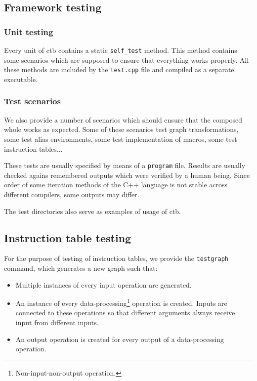\subsection*{Framework testing}

\subsubsection{Unit testing}
Every unit of ctb contains a static \texttt{self\_test} method. This method contains some scenarios which are supposed to ensure that everything works properly. All these methods are included by the \texttt{test.cpp} file and compiled as a separate executable.

\subsubsection{Test scenarios}
We also provide a number of scenarios which should ensure that the composed whole works as expected. Some of these scenarios test graph transformations, some test alias environments, some test implementation of macros, some test instruction tables...

These tests are usually specified by means of a \texttt{program} file. Results are usually checked agains remembered outputs which were verified by a human being. Since order of some iteration methods of the C++ language is not stable across different compilers, some outputs may differ.

The test directories also serve as examples of usage of ctb.

\subsection*{Instruction table testing}

For the purpose of testing of instruction tables, we provide the \texttt{testgraph} command, which generates a new graph such that:
\begin{itemize}
  \item Multiple instances of every input operation are generated.
  \item An instance of every data-processing\footnote{Non-input-non-output operation.} operation is created. Inputs are connected to these operations so that different arguments always receive input from different inputs.
  \item An output operation is created for every output of a data-processing operation.
\end{itemize}


